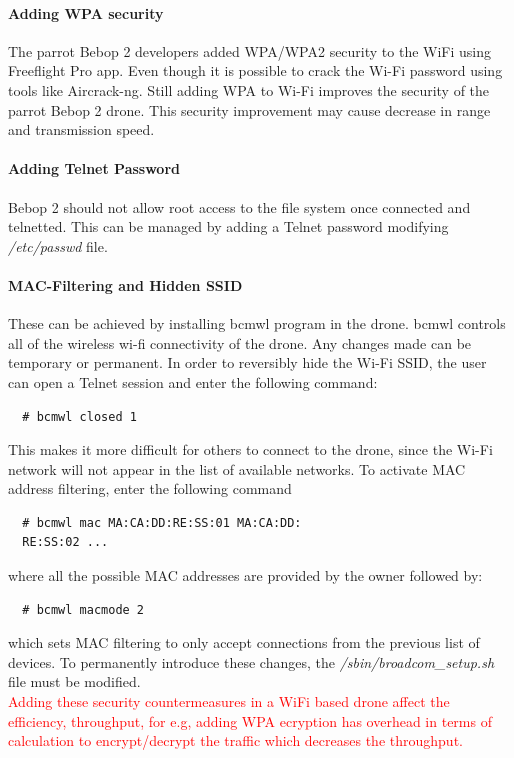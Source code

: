 \documentclass[conference]{IEEEtran}
\begin{document}
\paragraph{Adding WPA security}
The parrot Bebop 2 developers added WPA/WPA2 security to the WiFi using Freeflight Pro app.
Even though it is possible to crack the Wi-Fi password using tools like Aircrack-ng. Still adding WPA to Wi-Fi improves the security of the parrot Bebop 2 drone.
This security improvement may cause decrease in range and transmission speed.

\paragraph{Adding Telnet Password}
Bebop 2 should not allow root access to the file system once connected and telnetted. This can be managed by adding a Telnet password modifying \emph{/etc/passwd} file. 
\paragraph{MAC-Filtering and Hidden SSID}
These can be achieved by installing bcmwl program in the drone. bcmwl controls all of the wireless wi-fi connectivity of the drone. Any changes made can be temporary or permanent. In order to reversibly hide the Wi-Fi SSID, the user can open a Telnet session and enter the following command:
\begin{lstlisting}
  # bcmwl closed 1
\end{lstlisting} 
This makes it more difficult for others to connect to the drone, since the Wi-Fi network will not appear in the list of available networks.
To activate MAC address filtering, enter the following command 
\begin{lstlisting}
  # bcmwl mac MA:CA:DD:RE:SS:01 MA:CA:DD:
  RE:SS:02 ...
\end{lstlisting} 
where all the possible MAC addresses are provided by the owner followed by:
\begin{lstlisting}
  # bcmwl macmode 2
\end{lstlisting} 

which sets MAC filtering to only accept connections from the previous list of devices. To permanently introduce these changes, the \emph{/sbin/broadcom\_setup.sh} file must be modified.\\
\textcolor{red}{Adding these security countermeasures in a WiFi based drone affect the efficiency, throughput, for e.g, adding WPA ecryption has overhead in terms of calculation to encrypt/decrypt the traffic which decreases the throughput.}
\end{document}
